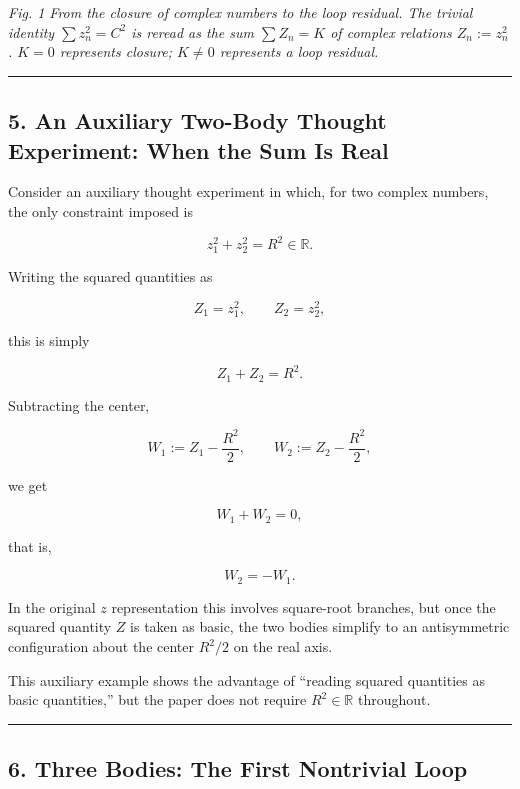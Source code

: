 \documentclass[
  a4paper,
]{article}
\begin{document}
\emph{Fig. 1 From the closure of complex numbers to the loop residual.
The trivial identity \(\sum z_n^2=C^2\) is reread as the sum
\(\sum Z_n=K\) of complex relations \(Z_n:=z_n^2\). \(K=0\) represents
closure; \(K\neq0\) represents a loop residual.}

\begin{center}\rule{0.5\linewidth}{0.5pt}\end{center}

\subsection{5. An Auxiliary Two-Body Thought Experiment: When the Sum Is
Real}\label{an-auxiliary-two-body-thought-experiment-when-the-sum-is-real}

Consider an auxiliary thought experiment in which, for two complex
numbers, the only constraint imposed is

\[
z_1^2+z_2^2=R^2\in\mathbb R.
\]

Writing the squared quantities as

\[
Z_1=z_1^2,\qquad Z_2=z_2^2,
\]

this is simply

\[
\boxed{Z_1+Z_2=R^2}.
\]

Subtracting the center,

\[
W_1:=Z_1-\frac{R^2}{2},\qquad
W_2:=Z_2-\frac{R^2}{2},
\]

we get

\[
\boxed{W_1+W_2=0},
\]

that is,

\[
W_2=-W_1.
\]

In the original \(z\) representation this involves square-root branches,
but once the squared quantity \(Z\) is taken as basic, the two bodies
simplify to an antisymmetric configuration about the center \(R^2/2\) on
the real axis.

This auxiliary example shows the advantage of ``reading squared
quantities as basic quantities,'' but the paper does not require
\(R^2\in\mathbb R\) throughout.

\begin{center}\rule{0.5\linewidth}{0.5pt}\end{center}

\subsection{6. Three Bodies: The First Nontrivial
Loop}\label{three-bodies-the-first-nontrivial-loop}
\end{document}
